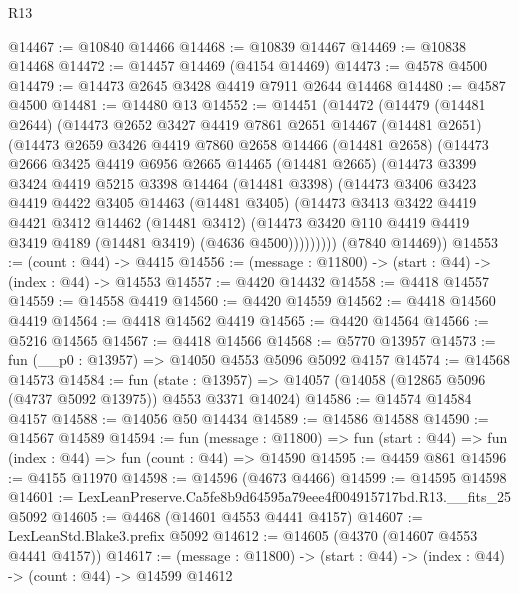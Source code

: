 \begin{lexlean}{R13}
\begin{coremodule}
@14467 := @10840 @14466
@14468 := @10839 @14467
@14469 := @10838 @14468
@14472 := @14457 @14469 (@4154 @14469)
@14473 := @4578 @4500
@14479 := @14473 @2645 @3428 @4419 @7911 @2644 @14468
@14480 := @4587 @4500
@14481 := @14480 @13
@14552 := @14451
    (@14472
      (@14479
        (@14481 @2644)
        (@14473
          @2652
          @3427
          @4419
          @7861
          @2651
          @14467
          (@14481 @2651)
          (@14473
            @2659
            @3426
            @4419
            @7860
            @2658
            @14466
            (@14481 @2658)
            (@14473
              @2666
              @3425
              @4419
              @6956
              @2665
              @14465
              (@14481 @2665)
              (@14473
                @3399
                @3424
                @4419
                @5215
                @3398
                @14464
                (@14481 @3398)
                (@14473
                  @3406
                  @3423
                  @4419
                  @4422
                  @3405
                  @14463
                  (@14481 @3405)
                  (@14473
                    @3413
                    @3422
                    @4419
                    @4421
                    @3412
                    @14462
                    (@14481 @3412)
                    (@14473 @3420 @110 @4419 @4419 @3419 @4189 (@14481 @3419) (@4636 @4500)))))))))
      (@7840 @14469))
@14553 := (count : @44) -> @4415
@14556 := (message : @11800) -> (start : @44) -> (index : @44) -> @14553
@14557 := @4420 @14432
@14558 := @4418 @14557
@14559 := @14558 @4419
@14560 := @4420 @14559
@14562 := @4418 @14560 @4419
@14564 := @4418 @14562 @4419
@14565 := @4420 @14564
@14566 := @5216 @14565
@14567 := @4418 @14566
@14568 := @5770 @13957
@14573 := fun (__p0 : @13957) => @14050 @4553 @5096 @5092 @4157
@14574 := @14568 @14573
@14584 := fun (state : @13957) =>
  @14057 (@14058 (@12865 @5096 (@4737 @5092 @13975)) @4553 @3371 @14024)
@14586 := @14574 @14584 @4157
@14588 := @14056 @50 @14434
@14589 := @14586 @14588
@14590 := @14567 @14589
@14594 := fun (message : @11800) =>
  fun (start : @44) => fun (index : @44) => fun (count : @44) => @14590
@14595 := @4459 @861
@14596 := @4155 @11970
@14598 := @14596 (@4673 @4466)
@14599 := @14595 @14598
@14601 := LexLeanPreserve.Ca5fe8b9d64595a79eee4f004915717bd.R13.__fits_25 @5092
@14605 := @4468 (@14601 @4553 @4441 @4157)
@14607 := LexLeanStd.Blake3.prefix @5092
@14612 := @14605 (@4370 (@14607 @4553 @4441 @4157))
@14617 := (message : @11800) -> (start : @44) -> (index : @44) -> (count : @44) -> @14599 @14612

\end{coremodule}
\end{lexlean}
